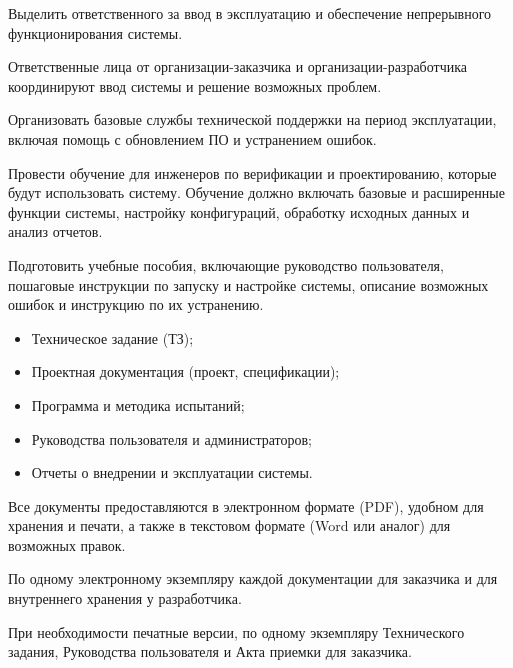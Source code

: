 Выделить ответственного за ввод в эксплуатацию
и обеспечение непрерывного функционирования системы.

Ответственные лица от организации-заказчика
и организации-разработчика координируют ввод системы
и решение возможных проблем.

Организовать базовые службы технической поддержки на период эксплуатации,
включая помощь с обновлением ПО и устранением ошибок.


Провести обучение для инженеров по верификации и проектированию,
которые будут использовать систему.
Обучение должно включать базовые и расширенные функции системы,
настройку конфигураций, обработку исходных данных и анализ отчетов.

Подготовить учебные пособия, включающие руководство пользователя,
пошаговые инструкции по запуску и настройке системы,
описание возможных ошибок и инструкцию по их устранению.



\begin{itemize}
	\item Техническое задание (ТЗ);
	\item Проектная документация (проект, спецификации);
	\item Программа и методика испытаний;
	\item Руководства пользователя и администраторов;
	\item Отчеты о внедрении и эксплуатации системы.
\end{itemize}



Все документы предоставляются в электронном формате (PDF),
удобном для хранения и печати,
а также в текстовом формате (Word или аналог) для возможных правок.


По одному электронному экземпляру каждой документации
для заказчика и для внутреннего хранения у разработчика.

При необходимости печатные версии, по одному экземпляру Технического задания,
Руководства пользователя и Акта приемки для заказчика.


